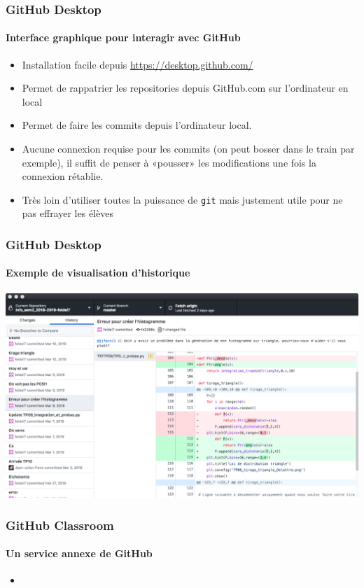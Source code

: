 \begin{frame}
	\frametitle{GitHub Desktop}
	\framesubtitle{Interface graphique pour interagir avec GitHub}

	\begin{itemize}[<+->]
		\item Installation facile depuis \url{https://desktop.github.com/}

		\item Permet de rappatrier les repositories depuis GitHub.com sur l'ordinateur en local

		\item Permet de faire les commits depuis l'ordinateur local.

		\item Aucune connexion requise pour les commits (on peut bosser dans le train par exemple), il suffit de penser à «pousser» les modifications une fois la connexion rétablie.

		\item Très loin d'utiliser toutes la puissance de \texttt{git} mais justement utile pour ne pas effrayer les élèves

	\end{itemize}

\end{frame}

\begin{frame}
	\frametitle{GitHub Desktop}
	\framesubtitle{Exemple de visualisation d'historique}

	\begin{center}
		\includegraphics[width=\linewidth]{figures/githubdesktop.png}
	\end{center}

\end{frame}

\begin{frame}
\frametitle{GitHub Classroom}
\framesubtitle{Un service annexe de GitHub}

\begin{itemize}[<+->]
	\item

\end{itemize}

\end{frame}
